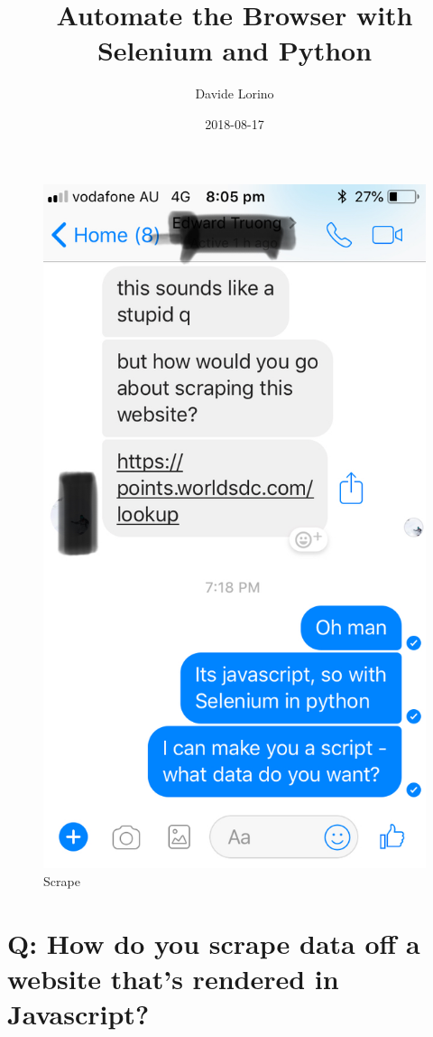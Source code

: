 \documentclass[]{article}
\title{Automate the Browser with Selenium and Python}
\author{Davide Lorino}
\date{2018-08-17}
\begin{document}
\maketitle

\begin{figure}
\centering
\includegraphics{Scrape.jpeg}
\caption{Scrape}
\end{figure}

\section{Q: How do you scrape data off a website that's rendered in
Javascript?}\label{q-how-do-you-scrape-data-off-a-website-thats-rendered-in-javascript}
\end{document}
